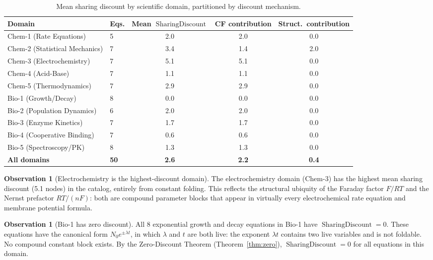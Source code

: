 \documentclass[12pt,a4paper]{article}
\theoremstyle{definition}
\newtheorem{observation}[theorem]{Observation}
\newcommand{\SD}{\operatorname{SharingDiscount}}
\begin{document}
\begin{table}[h]
\centering
\caption{Mean sharing discount by scientific domain, partitioned by
         discount mechanism.}
\label{tab:domain}
\smallskip
\begin{tabular}{@{}llccc@{}}
\toprule
\textbf{Domain} & \textbf{Eqs.} & \textbf{Mean $\SD$} &
  \textbf{CF contribution} & \textbf{Struct.\ contribution} \\
\midrule
Chem-1 (Rate Equations)        & 5 & 2.0 & 2.0 & 0.0 \\
Chem-2 (Statistical Mechanics) & 7 & 3.4 & 1.4 & 2.0 \\
Chem-3 (Electrochemistry)      & 7 & 5.1 & 5.1 & 0.0 \\
Chem-4 (Acid-Base)             & 7 & 1.1 & 1.1 & 0.0 \\
Chem-5 (Thermodynamics)        & 7 & 2.9 & 2.9 & 0.0 \\
\midrule
Bio-1 (Growth/Decay)           & 8 & 0.0 & 0.0 & 0.0 \\
Bio-2 (Population Dynamics)    & 6 & 2.0 & 2.0 & 0.0 \\
Bio-3 (Enzyme Kinetics)        & 7 & 1.7 & 1.7 & 0.0 \\
Bio-4 (Cooperative Binding)    & 7 & 0.6 & 0.6 & 0.0 \\
Bio-5 (Spectroscopy/PK)        & 8 & 1.3 & 1.3 & 0.0 \\
\midrule
\textbf{All domains}  & \textbf{50} & \textbf{2.6} & \textbf{2.2} & \textbf{0.4} \\
\bottomrule
\end{tabular}
\end{table}

\begin{observation}[Electrochemistry is the highest-discount domain]
\label{obs:echem}
The electrochemistry domain (Chem-3) has the highest mean sharing discount
(5.1 nodes) in the catalog, entirely from constant folding.  This reflects
the structural ubiquity of the Faraday factor $F/RT$ and the Nernst
prefactor $RT/(nF)$: both are compound parameter blocks that appear in
virtually every electrochemical rate equation and membrane potential formula.
\end{observation}

\begin{observation}[Bio-1 has zero discount]
\label{obs:bio1}
All 8 exponential growth and decay equations in Bio-1 have $\SD = 0$.
These equations have the canonical form $N_0 e^{\pm \lambda t}$, in which
$\lambda$ and $t$ are both live: the exponent $\lambda t$ contains two
live variables and is not foldable.  No compound constant block exists.
By the Zero-Discount Theorem (Theorem~\ref{thm:zero}), $\SD = 0$ for all
equations in this domain.
\end{observation}
\end{document}
